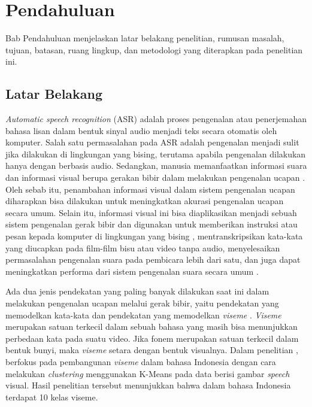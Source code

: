 \chapter{Pendahuluan}

Bab Pendahuluan menjelaskan latar belakang penelitian, rumusan masalah, tujuan, batasan, ruang lingkup, dan metodologi yang diterapkan pada penelitian ini.


\section{Latar Belakang}

\textit{Automatic speech recognition} (ASR) adalah proses pengenalan atau penerjemahan bahasa lisan dalam bentuk sinyal audio menjadi teks secara otomatis oleh komputer. Salah satu permasalahan pada ASR adalah pengenalan menjadi sulit jika dilakukan di lingkungan yang bising, terutama apabila pengenalan dilakukan hanya dengan berbasis audio. Sedangkan, manusia memanfaatkan informasi suara dan informasi visual berupa gerakan bibir dalam melakukan pengenalan ucapan \parencite{Calvert2004}. Oleh sebab itu, penambahan informasi visual dalam sistem pengenalan ucapan diharapkan bisa dilakukan untuk meningkatkan akurasi pengenalan ucapan secara umum. Selain itu, informasi visual ini bisa diaplikasikan menjadi sebuah sistem pengenalan gerak bibir dan digunakan untuk memberikan instruksi atau pesan kepada komputer di lingkungan yang bising \parencite{Garg2016}, mentranskripsikan kata-kata yang diucapkan pada film-film bisu atau video tanpa audio, menyelesaikan permasalahan pengenalan suara pada pembicara lebih dari satu, dan juga dapat meningkatkan performa dari sistem pengenalan suara secara umum \parencite{Chung2017}.
\bigskip

Ada dua jenis pendekatan yang paling banyak dilakukan saat ini dalam melakukan pengenalan ucapan melalui gerak bibir, yaitu pendekatan yang memodelkan kata-kata \parencite{Wand2016} dan pendekatan yang memodelkan \textit{viseme} \parencite{Chung2017}. \textit{Viseme} merupakan satuan terkecil dalam sebuah bahasa yang masih bisa menunjukkan perbedaan kata pada suatu video. Jika fonem merupakan satuan terkecil dalam bentuk bunyi, maka \textit{viseme} setara dengan bentuk visualnya. Dalam penelitian \textcite{Arifin2013}, berfokus pada pembangunan \textit{viseme} dalam bahasa Indonesia dengan cara melakukan \textit{clustering} menggunakan K-Means pada data berisi gambar \textit{speech} visual. Hasil penelitian tersebut menunjukkan bahwa dalam bahasa Indonesia terdapat 10 kelas viseme.
\bigskip

